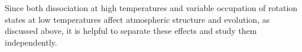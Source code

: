\documentclass[apj]{emulateapj}
\begin{document}
Since both dissociation at high temperatures and variable occupation of rotation states at low temperatures affect atmospheric structure and evolution, as discussed above, it is helpful to separate these effects and study them independently. 

%
%
%
%
%
%


\end{document}
